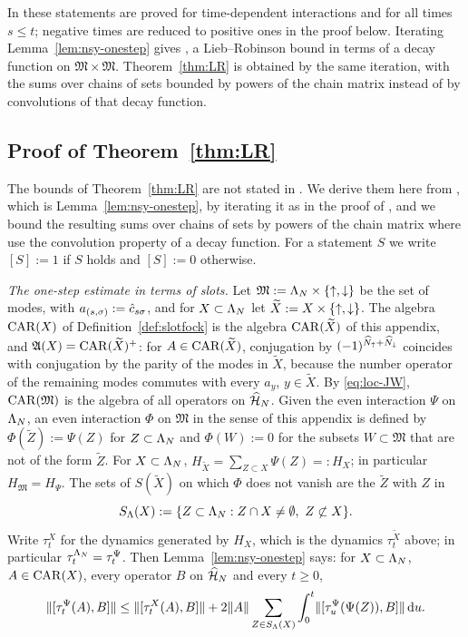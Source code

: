 In \cite{NSY18} these statements are proved for time-dependent interactions and for all times $s\le t$; negative
times are reduced to positive ones in the proof below. Iterating
Lemma~\ref{lem:nsy-onestep} gives \cite[Theorem~3.1]{NSY18}, a Lieb--Robinson bound in terms of a decay function
on $\mathfrak M\times\mathfrak M$. Theorem~\ref{thm:LR} is obtained by the same iteration, with the sums over chains of
sets bounded by powers of the chain matrix instead of by convolutions of that decay function.

\subsection{Proof of Theorem~\ref{thm:LR}}

The bounds of Theorem~\ref{thm:LR} are not stated in \cite{NSY18}. We derive them here from
\cite[Lemma~3.3]{NSY18}, which is Lemma~\ref{lem:nsy-onestep}, by iterating it as in the proof of
\cite[Theorem~3.1]{NSY18}, and we bound the resulting sums over chains of sets by powers of the chain matrix where
\cite{NSY18} use the convolution property of a decay function. For a statement $S$ we write $[S]:=1$ if $S$ holds
and $[S]:=0$ otherwise.

\emph{The one-step estimate in terms of slots.} Let $\mathfrak M:=\Lambda_N\times\{{\uparrow},{\downarrow}\}$ be the set of modes, with
$a_{(s,\sigma)}:=\hat{c}_{s\sigma}$, and for $X\subset\Lambda_N$ let $\widetilde X:=X\times\{{\uparrow},{\downarrow}\}$. The algebra $\mathrm{CAR}(X)$ of
Definition~\ref{def:slotfock} is the algebra $\mathrm{CAR}(\widetilde X)$ of this appendix, and $\mathfrak{A}(X)=\mathrm{CAR}(\widetilde X)^+$: for
$A\in\mathrm{CAR}(\widetilde X)$, conjugation by $(-1)^{\widehat{N}_{{\uparrow}}+\widehat{N}_{{\downarrow}}}$ coincides with conjugation by the parity of the modes in
$\widetilde X$, because the number operator of the remaining modes commutes with every $a_y$, $y\in\widetilde X$. By
\eqref{eq:loc-JW}, $\mathrm{CAR}(\mathfrak M)$ is the algebra of all operators on $\widehat{\mathcal{H}}_N$. Given the even interaction $\Psi$ on
$\Lambda_N$, an even interaction $\Phi$ on $\mathfrak M$ in the sense of this appendix is defined by $\Phi(\widetilde Z):=\Psi(Z)$
for $Z\subset\Lambda_N$ and $\Phi(W):=0$ for the subsets $W\subset\mathfrak M$ that are not of the form $\widetilde Z$. For
$X\subset\Lambda_N$, $H_{\widetilde X}=\sum_{Z\subset X}\Psi(Z)=:H_X$; in particular $H_{\mathfrak M}=H_\Psi$. The sets of
$S(\widetilde X)$ on which $\Phi$ does not vanish are the $\widetilde Z$ with $Z$ in
\[
S_\Lambda(X):=\{Z\subset\Lambda_N:Z\cap X\ne\emptyset,\ Z\not\subset X\}.
\]
Write $\tau^X_t$ for the dynamics generated by $H_X$, which is the dynamics $\tau^{\widetilde X}_t$ above; in particular
$\tau^{\Lambda_N}_t=\tau^\Psi_t$. Then
Lemma~\ref{lem:nsy-onestep} says: for $X\subset\Lambda_N$, $A\in\mathrm{CAR}(X)$, every operator $B$ on $\widehat{\mathcal{H}}_N$ and every $t\ge0$,
\begin{equation}\label{eq:LR-onestep}
\lVert[\tau^\Psi_t(A),B]\rVert\le\lVert[\tau^X_t(A),B]\rVert+2\lVert A\rVert\sum_{Z\in S_\Lambda(X)}\int_0^t\lVert[\tau^\Psi_u(\Psi(Z)),B]\rVert\,\mathrm{d} u .
\end{equation}

